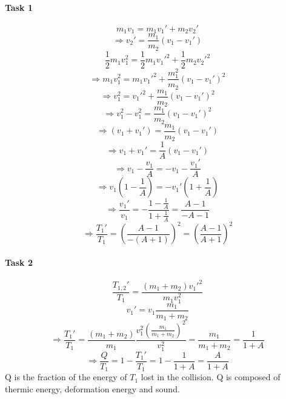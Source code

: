 \documentclass{scrreprt}
\begin{document}
\paragraph*{Task 1}
\begin{equation}
m_1v_1=m_1v_1'+m_2v_2'
\end{equation}
\begin{equation}
\Rightarrow v_2'=\frac{m_1}{m_2}(v_1-v_1')
\end{equation}
\begin{equation}
\frac{1}{2}m_1v_1^2=\frac{1}{2}m_1v_1'^2+\frac{1}{2}m_2v_2'^2
\end{equation}
\begin{equation}
\Rightarrow m_1v_1^2=m_1v_1'^2+\frac{m_1^2}{m_2}(v_1-v_1')^2
\end{equation}
\begin{equation}
\Rightarrow v_1^2=v_1'^2+\frac{m_1}{m_2}(v_1-v_1')^2
\end{equation}
\begin{equation}
\Rightarrow v_1^2-v_1^2=\frac{m_1}{m_2}(v_1-v_1')^2
\end{equation}
\begin{equation}
\Rightarrow (v_1+v_1')=\frac{m_1}{m_2}(v_1-v_1')
\end{equation}
\begin{equation}
\Rightarrow v_1+v_1'=\frac{1}{A}(v_1-v_1')
\end{equation}
\begin{equation}
\Rightarrow v_1-\frac{v_1}{A}=-v_1-\frac{v_1'}{A}
\end{equation}
\begin{equation}
\Rightarrow v_1\left(1-\frac{1}{A}\right)=-v_1'\left(1+\frac{1}{A}\right)
\end{equation}
\begin{equation}
\Rightarrow \frac{v_1'}{v_1}=-\frac{1-\frac{1}{A}}{1+\frac{1}{A}} = \frac{A-1}{-A-1}
\end{equation}
\begin{equation}
\Rightarrow \frac{T_1'}{T_1} = \left(\frac{A-1}{-(A+1)}\right)^2=\left(\frac{A-1}{A+1}\right)^2
\end{equation}

\paragraph*{Task 2}
\begin{equation}
\frac{T_{1,2}'}{T_1}=\frac{(m_1+m_2)v_1'^2}{m_1v_1^2}
\end{equation}
\begin{equation}
v_1'=v_1\frac{m_1}{m_1+m_2}
\end{equation}
\begin{equation}
\Rightarrow \frac{T_1'}{T_1}= \frac{(m_1+m_2)}{m_1}\frac{v_1^2\left(\frac{m_1}{m_1+m_2}\right)^2}{v_1^2}=\frac{m_1}{m_1+m_2}=\frac{1}{1+A}
\end{equation}
\begin{equation}
\Rightarrow \frac{Q}{T_1}=1-\frac{T_1'}{T_1}=1-\frac{1}{1+A}=\frac{A}{1+A}
\end{equation}
Q is the fraction of the energy of $T_1$ lost in the collision. Q is composed of thermic energy, deformation energy and sound.
\end{document}
